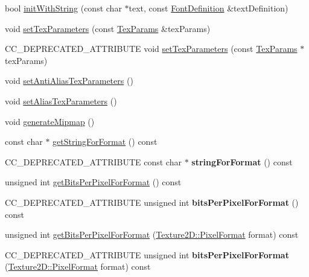 \begin{DoxyCompactItemize}
\item 
bool \hyperlink{classTexture2D_a2c00c9110a7fbaca76ea41e756dabeea}{init\+With\+String} (const char $\ast$text, const \hyperlink{structFontDefinition}{Font\+Definition} \&text\+Definition)
\item 
void \hyperlink{classTexture2D_acdea523f6f6306462129e45b185205e4}{set\+Tex\+Parameters} (const \hyperlink{classTexture2D_af2ea04a3dfcdf7274db17dda4bd555e3}{Tex\+Params} \&tex\+Params)
\item 
C\+C\+\_\+\+D\+E\+P\+R\+E\+C\+A\+T\+E\+D\+\_\+\+A\+T\+T\+R\+I\+B\+U\+TE void \hyperlink{classTexture2D_a002022936392284060c890589b3a4bca}{set\+Tex\+Parameters} (const \hyperlink{classTexture2D_af2ea04a3dfcdf7274db17dda4bd555e3}{Tex\+Params} $\ast$tex\+Params)
\item 
void \hyperlink{classTexture2D_a2b9bc7bc273b0793c6b58010c55724e6}{set\+Anti\+Alias\+Tex\+Parameters} ()
\item 
void \hyperlink{classTexture2D_affbb5fcc6fee13cfab17dada97d59904}{set\+Alias\+Tex\+Parameters} ()
\item 
void \hyperlink{classTexture2D_a91bccde122da02002c5518480474c177}{generate\+Mipmap} ()
\item 
const char $\ast$ \hyperlink{classTexture2D_ac3c139b0e9dd7a2e02b8b8e8d413620b}{get\+String\+For\+Format} () const
\item 
\mbox{\label{classTexture2D_a4f33e9b9373d54060bf5edffd0dd8479}} 
C\+C\+\_\+\+D\+E\+P\+R\+E\+C\+A\+T\+E\+D\+\_\+\+A\+T\+T\+R\+I\+B\+U\+TE const char $\ast$ {\bfseries string\+For\+Format} () const
\item 
unsigned int \hyperlink{classTexture2D_af29476c171cc5167c8392265f80fb9af}{get\+Bits\+Per\+Pixel\+For\+Format} () const
\item 
\mbox{\label{classTexture2D_a931434c465fc156e8c4679829884aec3}} 
C\+C\+\_\+\+D\+E\+P\+R\+E\+C\+A\+T\+E\+D\+\_\+\+A\+T\+T\+R\+I\+B\+U\+TE unsigned int {\bfseries bits\+Per\+Pixel\+For\+Format} () const
\item 
unsigned int \hyperlink{classTexture2D_ada259b363b6d48c23acfcc79db3d2a47}{get\+Bits\+Per\+Pixel\+For\+Format} (\hyperlink{classTexture2D_a45d9d8bb5a0669def36bbdfbfb91d220}{Texture2\+D\+::\+Pixel\+Format} format) const
\item 
\mbox{\label{classTexture2D_afe02fb3ca232889c58339125bf2e2e8e}} 
C\+C\+\_\+\+D\+E\+P\+R\+E\+C\+A\+T\+E\+D\+\_\+\+A\+T\+T\+R\+I\+B\+U\+TE unsigned int {\bfseries bits\+Per\+Pixel\+For\+Format} (\hyperlink{classTexture2D_a45d9d8bb5a0669def36bbdfbfb91d220}{Texture2\+D\+::\+Pixel\+Format} format) const

\end{DoxyCompactItemize}
